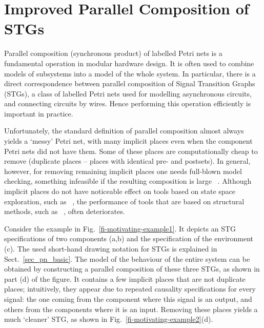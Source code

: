 \section{Improved Parallel Composition of STGs}\label{sec_intro}


Parallel composition (synchronous product) of labelled
Petri nets is a fundamental operation in modular hardware design. It is
often used to combine models of subsystems into a model of the
whole system. In particular, there is a direct correspondence
between parallel composition of Signal Transition Graphs
(STGs), a class of labelled Petri nets used for modelling
asynchronous circuits, and connecting circuits by wires. Hence
performing this operation efficiently is important in practice.

Unfortunately, the standard definition of parallel composition almost always yields a `messy' Petri net, with many implicit places even when the component Petri nets did not have them. Some of these places are computationally cheap to remove (\eg duplicate places -- places with identical pre- and postsets). In general, however, for removing remaining implicit places one needs full-blown model checking, something infeasible if the resulting composition is large ~\cite{Schaefer06strategiesfor}.
Although implicit places do not have noticeable effect on tools based on state space exploration, such as \petrify~\cite{ckkly97}, the performance of tools that are based on structural methods, such as \desij~\cite{Sch07}, often deteriorates.

Consider the example in Fig.~\ref{fi-motivating-example1}. It
depicts an STG specifications of two components (a,b) and
the specification of the environment (c). The used short-hand
drawing notation for STGs is explained in
Sect.~\ref{sec_pn_basic}. The model of the behaviour of the
entire system can be obtained by constructing a parallel
composition of these three STGs, as shown in part (d) of
the figure. It contains a few implicit places
that are not duplicate places; intuitively, they appear due
to repeated causality specifications for every signal: the one
coming from the component where this signal is an output, and
others from the components where it is an input. Removing
these places yields a much `cleaner' STG, as
shown in Fig.~\ref{fi-motivating-example2}(d).

